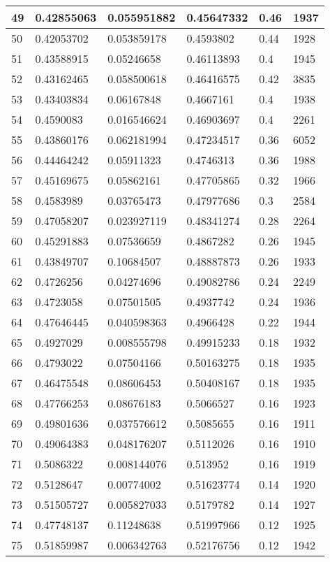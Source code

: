 \begin{longtable}{|l|l|l|l|l|l|}
49 & 0.42855063 & 0.055951882 & 0.45647332 & 0.46 & 1937 \\ \hline 
50 & 0.42053702 & 0.053859178 & 0.4593802 & 0.44 & 1928 \\ \hline 
51 & 0.43588915 & 0.05246658 & 0.46113893 & 0.4 & 1945 \\ \hline 
52 & 0.43162465 & 0.058500618 & 0.46416575 & 0.42 & 3835 \\ \hline 
53 & 0.43403834 & 0.06167848 & 0.4667161 & 0.4 & 1938 \\ \hline 
54 & 0.4590083 & 0.016546624 & 0.46903697 & 0.4 & 2261 \\ \hline 
55 & 0.43860176 & 0.062181994 & 0.47234517 & 0.36 & 6052 \\ \hline 
56 & 0.44464242 & 0.05911323 & 0.4746313 & 0.36 & 1988 \\ \hline 
57 & 0.45169675 & 0.05862161 & 0.47705865 & 0.32 & 1966 \\ \hline 
58 & 0.4583989 & 0.03765473 & 0.47977686 & 0.3 & 2584 \\ \hline 
59 & 0.47058207 & 0.023927119 & 0.48341274 & 0.28 & 2264 \\ \hline 
60 & 0.45291883 & 0.07536659 & 0.4867282 & 0.26 & 1945 \\ \hline 
61 & 0.43849707 & 0.10684507 & 0.48887873 & 0.26 & 1933 \\ \hline 
62 & 0.4726256 & 0.04274696 & 0.49082786 & 0.24 & 2249 \\ \hline 
63 & 0.4723058 & 0.07501505 & 0.4937742 & 0.24 & 1936 \\ \hline 
64 & 0.47646445 & 0.040598363 & 0.4966428 & 0.22 & 1944 \\ \hline 
65 & 0.4927029 & 0.008555798 & 0.49915233 & 0.18 & 1932 \\ \hline 
66 & 0.4793022 & 0.07504166 & 0.50163275 & 0.18 & 1935 \\ \hline 
67 & 0.46475548 & 0.08606453 & 0.50408167 & 0.18 & 1935 \\ \hline 
68 & 0.47766253 & 0.08676183 & 0.5066527 & 0.16 & 1923 \\ \hline 
69 & 0.49801636 & 0.037576612 & 0.5085655 & 0.16 & 1911 \\ \hline 
70 & 0.49064383 & 0.048176207 & 0.5112026 & 0.16 & 1910 \\ \hline 
71 & 0.5086322 & 0.008144076 & 0.513952 & 0.16 & 1919 \\ \hline 
72 & 0.5128647 & 0.00774002 & 0.51623774 & 0.14 & 1920 \\ \hline 
73 & 0.51505727 & 0.005827033 & 0.5179782 & 0.14 & 1927 \\ \hline 
74 & 0.47748137 & 0.11248638 & 0.51997966 & 0.12 & 1925 \\ \hline 
75 & 0.51859987 & 0.006342763 & 0.52176756 & 0.12 & 1942 \\ \hline 
\end{longtable}